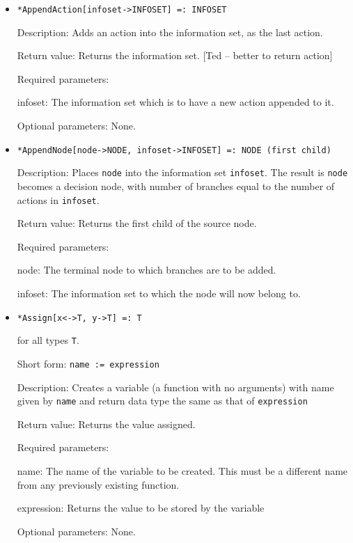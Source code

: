 \begin{itemize}
\item
\protect \large \begin{verbatim}
*AppendAction[infoset->INFOSET] =: INFOSET
\end{verbatim}\normalsize

\bd
\item
[Description:] Adds an action into the information set, as the last
action. 
\item
[Return value:] Returns the information set. [Ted -- better to return action]
\item
[Required parameters:]\hfil\null

\bd
\item
[infoset:] The information set which is to have a new
action appended to it.
\ed

\item
[Optional parameters:] None.\hfill\null
\ed


\item
\protect \large \begin{verbatim} 
*AppendNode[node->NODE, infoset->INFOSET] =: NODE (first child)
\end{verbatim}\normalsize

\bd
\item
[Description:] Places \verb+node+ into the information set
\verb+infoset+.  The result is \verb+node+ becomes a decision node,
with number of branches equal to the number of actions in \verb+infoset+.

\item
[Return value:] Returns the first child of the source node.
\item
[Required parameters:]\hfil\null
\par
\bd
\item
[node:] The terminal node to which branches are to be added.
\item
[infoset:] The information set to which the node will now belong to.
\ed
\ed

\item 
\protect \large \begin{verbatim}
*Assign[x<->T, y->T] =: T
\end{verbatim} \normalsize
for all types {\tt T}.
\bd
\item
[Short form:] \verb+name := expression+
\item
[Description:] Creates a variable (a function with no arguments) with name
given by \verb+name+ and return data type the same as that of
\verb+expression+
\item
[Return value:] Returns the value assigned.
\item
[Required parameters:]\hfil\null
\bd
\item
[name:] The name of the variable to be created.  This must be a different
name from any previously existing function.  
\item
[expression:] Returns the value to be stored by the variable
\ed
\item
[Optional parameters:] None.
\ed


\end{itemize}
